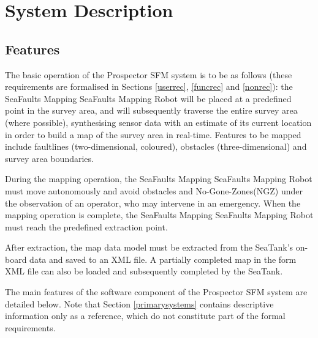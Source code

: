 \documentclass[12pt]{article}
\begin{document}
\section{System Description}

\subsection{Features}

The basic operation of the Prospector SFM system is to be as follows\cite{spec}  (these requirements are formalised in Sections \ref{userrec}, \ref{funcrec} and \ref{nonrec}): the SeaFaults Mapping SeaFaults Mapping Robot will be placed at a predefined point in the survey area, and will subsequently traverse the entire survey area (where possible), synthesising sensor data with an estimate of its current location in order to build a map of the survey area in real-time. Features to be mapped include faultlines (two-dimensional, coloured), obstacles (three-dimensional) and survey area boundaries. 

During the mapping operation, the SeaFaults Mapping SeaFaults Mapping Robot must move autonomously and avoid obstacles and No-Gone-Zones(NGZ) under the observation of an operator, who may intervene in an emergency. When the mapping operation is complete, the SeaFaults Mapping SeaFaults Mapping Robot must reach the predefined extraction point. 

After extraction, the map data model must be extracted from the SeaTank's on-board data and saved to an XML file. A partially completed map in the form XML file can also be loaded and subsequently completed by the SeaTank.

The main features of the software component of the Prospector
SFM system are detailed below. Note that Section \ref{primarysystems} contains descriptive information only as a reference, which do not constitute part of the formal requirements.
\end{document}

